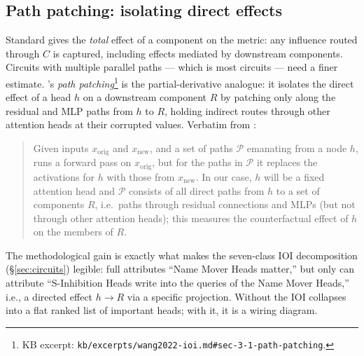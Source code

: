 \subsection{Path patching: isolating direct effects}
\label{sec:patching-path}

Standard  gives the \emph{total} effect of a
component on the metric: any influence routed through $C$ is captured,
including effects mediated by downstream components. Circuits with
multiple parallel paths --- which is most circuits --- need a finer
estimate. \citet[\S 3.1]{wang2022-ioi}'s \emph{path
patching}\footnote{KB excerpt:
\texttt{kb/excerpts/wang2022-ioi.md\#sec-3-1-path-patching}.} is the
partial-derivative analogue: it isolates the direct effect of a head
$h$ on a downstream component $R$ by patching only along the residual
and MLP paths from $h$ to $R$, holding indirect routes through other
attention heads at their corrupted values. Verbatim from
\citet[\S 3.1]{wang2022-ioi}:

\begin{quote}
Given inputs $x_{\text{orig}}$ and $x_{\text{new}}$, and a set of paths
$\mathcal{P}$ emanating from a node $h$,  runs a forward
pass on $x_{\text{orig}}$, but for the paths in $\mathcal{P}$ it
replaces the activations for $h$ with those from $x_{\text{new}}$. In
our case, $h$ will be a fixed attention head and $\mathcal{P}$
consists of all direct paths from $h$ to a set of components $R$, i.e.\
paths through residual connections and MLPs (but not through other
attention heads); this measures the counterfactual effect of $h$ on
the members of $R$.
\end{quote}

The methodological gain is exactly what makes the seven-class IOI
decomposition (\S\ref{sec:circuits}) legible: full 
attributes ``Name Mover Heads matter,'' but only \glsterm{path-patching}{path patching} can
attribute ``S-Inhibition Heads write into the queries of the Name
Mover Heads,'' i.e., a directed effect $h \to R$ via a specific
projection. Without  the IOI  collapses into a
flat ranked list of important heads; with it, it is a wiring diagram.

